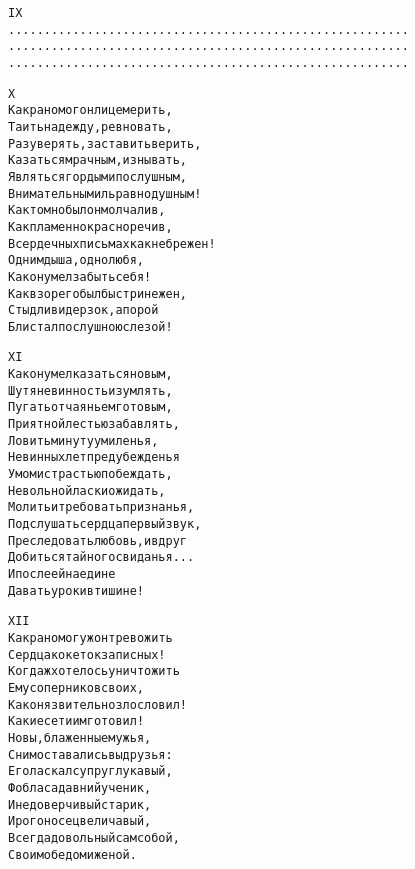 \begin{minipage}[t]{\dimexpr 0.5\textwidth -\tabcolsep-.5pt}
\begin{alltt}\normalfont\centering
IX
 ........................................................
 ........................................................
 ........................................................
\end{alltt}
\end{minipage}

\vspace{4in}

\begin{minipage}[t]{\dimexpr 0.5\textwidth -\tabcolsep-.5pt}
\begin{alltt}\normalfont\centering
X
Как рано мог он лицемерить,
Таить надежду, ревновать,
Разуверять, заставить верить,
Казаться мрачным, изнывать,
Являться гордым и послушным,
Внимательным иль равнодушным!
Как томно был он молчалив,
Как пламенно красноречив,
В сердечных письмах как небрежен!
Одним дыша, одно любя,
Как он умел забыть себя!
Как взор его был быстр и нежен,
Стыдлив и дерзок, а порой
Блистал послушною слезой!
\end{alltt}
\end{minipage}
\clearpage

\begin{minipage}[t]{\dimexpr 0.5\textwidth -\tabcolsep-.5pt}
\begin{alltt}\normalfont\centering
XI
Как он умел казаться новым,
Шутя невинность изумлять,
Пугать отчаяньем готовым,
Приятной лестью забавлять,
Ловить минуту умиленья,
Невинных лет предубежденья
Умом и страстью побеждать,
Невольной ласки ожидать,
Молить и требовать признанья,
Подслушать сердца первый звук,
Преследовать любовь, и вдруг
Добиться тайного свиданья...
И после ей наедине
Давать уроки в тишине!
\end{alltt}
\end{minipage}

\begin{minipage}[t]{\dimexpr 0.5\textwidth -\tabcolsep-.5pt}
\begin{alltt}\normalfont\centering
XII
Как рано мог уж он тревожить
Сердца кокеток записных!
Когда ж хотелось уничтожить
Ему соперников своих,
Как он язвительно злословил!
Какие сети им готовил!
Но вы, блаженные мужья,
С ним оставались вы друзья:
Его ласкал супруг лукавый,
Фобласа давний ученик,
И недоверчивый старик,
И рогоносец величавый,
Всегда довольный сам собой,
Своим обедом и женой.
\end{alltt}
\end{minipage}
\clearpage

